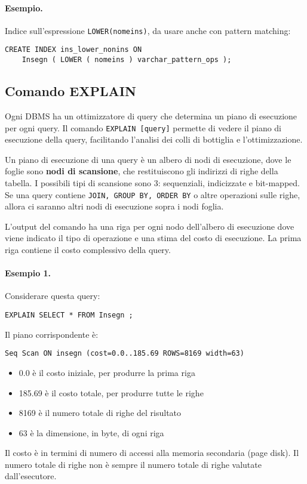 \documentclass[a4paper, 10pt, titlepage]{article}
\begin{document}
\paragraph{Esempio.}Indice sull'espressione \lstinline|LOWER(nomeins)|, da usare anche con pattern matching:
\begin{lstlisting}
CREATE INDEX ins_lower_nonins ON
	Insegn ( LOWER ( nomeins ) varchar_pattern_ops );
\end{lstlisting}

 	\subsection{Comando EXPLAIN}
	Ogni DBMS ha un ottimizzatore di query che determina un piano di esecuzione per ogni query. Il comando \lstinline|EXPLAIN [query]| permette di vedere il piano di esecuzione della query, facilitando l'analisi dei colli di bottiglia e l'ottimizzazione.
	
	Un piano di esecuzione di una query è un albero di nodi di esecuzione, dove le foglie sono \textbf{nodi di scansione}, che restituiscono gli indirizzi di righe della tabella. I possibili tipi di scansione sono 3: sequenziali, indicizzate e bit-mapped. Se una query contiene \lstinline|JOIN, GROUP BY, ORDER BY| o altre operazioni sulle righe, allora ci saranno altri nodi di esecuzione sopra i nodi foglia.
	
	L'output del comando ha una riga per ogni nodo dell'albero di esecuzione dove viene indicato il tipo di operazione e una stima del costo di esecuzione. La prima riga contiene il costo complessivo della query.
	
	\paragraph{Esempio 1.}
	Considerare questa query:
	\begin{lstlisting}
EXPLAIN SELECT * FROM Insegn ;
	\end{lstlisting}
	Il piano corrispondente è:
	\begin{lstlisting}
Seq Scan ON insegn (cost=0.0..185.69 ROWS=8169 width=63)
	\end{lstlisting}
	\begin{itemize}
	\item 0.0 è il costo iniziale, per produrre la prima riga 
	\item 185.69 è il costo totale, per produrre tutte le righe
	\item 8169 è il numero totale di righe del risultato
	\item 63 è la dimensione, in byte, di ogni riga
	\end{itemize} 
	Il costo è in termini di numero di accessi alla memoria secondaria (page disk). Il numero totale di righe non è sempre il numero totale di righe valutate dall’esecutore.\medskip
	
\end{document}
